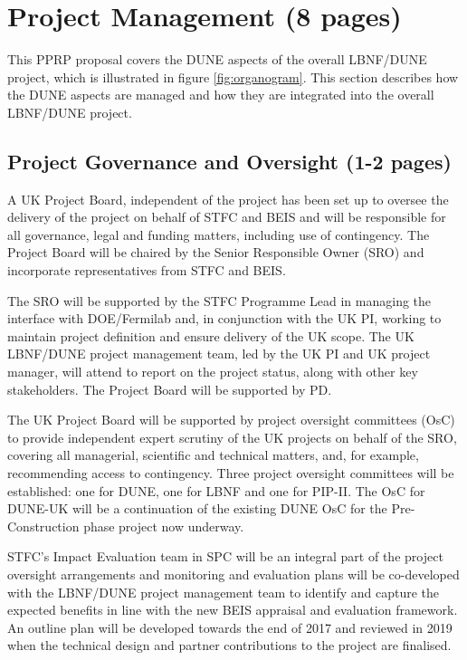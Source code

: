 \section{Project Management (8 pages)}

This PPRP proposal covers the DUNE aspects of the overall LBNF/DUNE project, which is illustrated in figure \ref{fig:organogram}. This section describes how the DUNE aspects are managed and how they are integrated into the overall LBNF/DUNE project.

\subsection{Project Governance and Oversight (1-2 pages)} 

A UK Project Board, independent of the project has been set up to oversee the delivery of the project on behalf of STFC and BEIS and will be responsible for all governance, legal and funding matters, including use of contingency. The Project Board will be chaired by the Senior Responsible Owner (SRO) and incorporate representatives from STFC and BEIS.

The SRO will be supported by the STFC Programme Lead in managing the interface with DOE/Fermilab and, in conjunction with the UK PI, working to maintain project definition and ensure delivery of the UK scope. The UK LBNF/DUNE project management team, led by the UK PI and UK project manager, will attend to report on the project status, along with other key stakeholders. The Project Board will be supported by PD.

The UK Project Board will be supported by project oversight committees (OsC) to provide independent expert scrutiny of the UK projects on behalf of the SRO, covering all managerial, scientific and technical matters, and, for example, recommending access to contingency. Three project oversight committees will be established: one for DUNE, one for LBNF and one for PIP-II. The OsC for DUNE-UK will be a continuation of the existing DUNE OsC for the Pre-Construction phase project now underway.

STFC’s Impact Evaluation team in SPC will be an integral part of the project oversight arrangements and monitoring and evaluation plans will be co-developed with the LBNF/DUNE project management team to identify and capture the expected benefits in line with the new BEIS appraisal and evaluation framework. An outline plan will be developed towards the end of 2017 and reviewed in 2019 when the technical design and partner contributions to the project are finalised.

